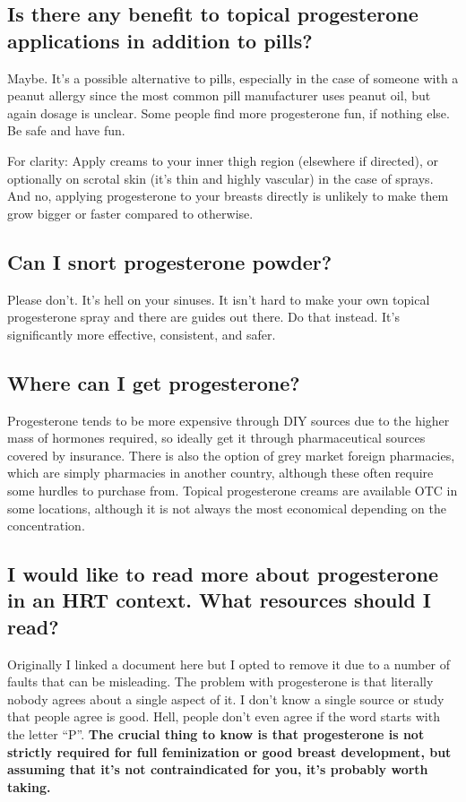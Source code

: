 \documentclass{article}
\begin{document}
\subsection{Is there any benefit to topical progesterone applications in addition to pills?}

Maybe. It's a possible alternative to pills, especially in the case of someone with a peanut allergy since the most common pill manufacturer uses peanut oil, but again dosage is unclear. Some people find more progesterone fun, if nothing else. Be safe and have fun.

For clarity: Apply creams to your inner thigh region (elsewhere if directed), or optionally on scrotal skin (it's thin and highly vascular) in the case of sprays. And no, applying progesterone to your breasts directly is unlikely to make them grow bigger or faster compared to otherwise.

\subsection{Can I snort progesterone powder?}

Please don’t. It’s hell on your sinuses. It isn’t hard to make your own topical progesterone spray and there are guides out there. Do that instead. It’s significantly more effective, consistent, and safer.

\subsection{Where can I get progesterone?}

Progesterone tends to be more expensive through DIY sources due to the higher mass of hormones required, so ideally get it through pharmaceutical sources covered by insurance. There is also the option of grey market foreign pharmacies, which are simply pharmacies in another country, although these often require some hurdles to purchase from. Topical progesterone creams are available OTC in some locations, although it is not always the most economical depending on the concentration.

\subsection{I would like to read more about progesterone in an HRT context. What resources should I read?}\label{8-17}

Originally I linked a document here but I opted to remove it due to a number of faults that can be misleading. The problem with progesterone is that literally nobody agrees about a single aspect of it. I don't know a single source or study that people agree is good. Hell, people don't even agree if the word starts with the letter “P”. \textbf{The crucial thing to know is that progesterone is not strictly required for full feminization or good breast development, but assuming that it's not contraindicated for you, it's probably worth taking.}
\end{document}
